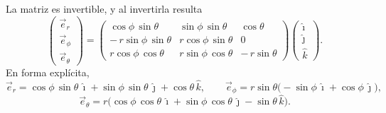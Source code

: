 \documentclass[../apunte_mecanica_clasica.tex]{subfiles}%
\begin{document}
\begin{apuntebloque}{}
La matriz es invertible, y al invertirla resulta
\begin{equation*}
\begin{pmatrix}
\vec{e}_r\\[2pt] \vec{e}_\phi\\[2pt] \vec{e}_\theta
\end{pmatrix}
=
\begin{pmatrix}
\cos\phi\,\sin\theta & \sin\phi\,\sin\theta & \cos\theta\\[6pt]
-\,r\sin\phi\,\sin\theta & r\cos\phi\,\sin\theta & 0\\[6pt]
r\cos\phi\,\cos\theta & r\sin\phi\,\cos\theta & -\,r\sin\theta
\end{pmatrix}
\begin{pmatrix}
\hat{\imath}\\[2pt] \hat{\jmath}\\[2pt] \hat{k}
\end{pmatrix}.
\end{equation*}
En forma explícita,
\begin{equation*}
\vec{e}_r = \cos\phi\,\sin\theta\,\hat{\imath} + \sin\phi\,\sin\theta\,\hat{\jmath} + \cos\theta\,\hat{k},
\qquad
\vec{e}_\phi = r\sin\theta\big(-\sin\phi\,\hat{\imath} + \cos\phi\,\hat{\jmath}\big),
\end{equation*}
\begin{equation*}
\vec{e}_\theta = r\big(\cos\phi\,\cos\theta\,\hat{\imath} + \sin\phi\,\cos\theta\,\hat{\jmath} - \sin\theta\,\hat{k}\big).
\end{equation*}
\end{apuntebloque}

\newpage
\end{document}
